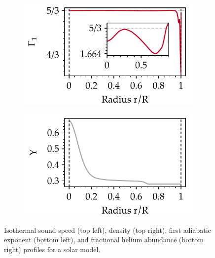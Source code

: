 \begin{figure}
\begin{subfigure}[b]{0.5\linewidth}
    \end{subfigure}\\
    \begin{subfigure}[b]{0.5\linewidth}
        \centering
        \includegraphics[width=\textwidth,keepaspectratio]{figs/pulse/diffs/prof_D-Gamma1.pdf}%
    \end{subfigure}%
    \begin{subfigure}[b]{0.5\linewidth}
        \centering
        \includegraphics[width=\textwidth,keepaspectratio]{figs/pulse/diffs/prof_D-Y.pdf}%
    \end{subfigure}
    \caption[The Sun's internal mechanical, thermal, and chemical profile]{Isothermal sound speed (top left), density (top right), first adiabatic exponent (bottom left), and fractional helium abundance (bottom right) profiles for a solar model. 
    \label{fig:profs} } 
    \vspace*{1cm}

\end{figure}
